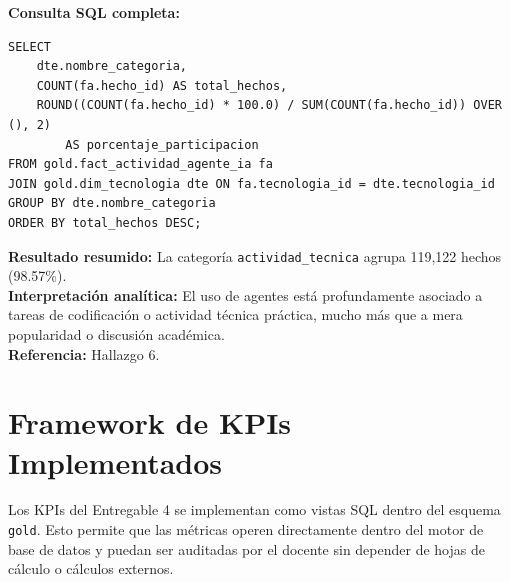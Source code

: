 \documentclass[12pt,a4paper]{article}
\begin{document}
\textbf{Consulta SQL completa:}
\begin{verbatim}
SELECT 
    dte.nombre_categoria,
    COUNT(fa.hecho_id) AS total_hechos,
    ROUND((COUNT(fa.hecho_id) * 100.0) / SUM(COUNT(fa.hecho_id)) OVER (), 2) 
        AS porcentaje_participacion
FROM gold.fact_actividad_agente_ia fa
JOIN gold.dim_tecnologia dte ON fa.tecnologia_id = dte.tecnologia_id
GROUP BY dte.nombre_categoria
ORDER BY total_hechos DESC;
\end{verbatim}
\textbf{Resultado resumido:} La categor\'ia \texttt{actividad\_tecnica} agrupa 119,122 hechos (98.57\%). \\
\textbf{Interpretaci\'on anal\'itica:} El uso de agentes est\'a profundamente asociado a tareas de codificaci\'on o actividad t\'ecnica pr\'actica, mucho m\'as que a mera popularidad o discusi\'on acad\'emica. \\
\textbf{Referencia:} Hallazgo 6.

\section{Framework de KPIs Implementados}

Los KPIs del Entregable 4 se implementan como vistas SQL dentro del esquema \texttt{gold}. Esto permite que las m\'etricas operen directamente dentro del motor de base de datos y puedan ser auditadas por el docente sin depender de hojas de c\'alculo o c\'alculos externos.
\end{document}

